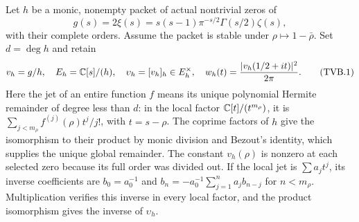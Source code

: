 Let $h$ be a monic, nonempty packet of actual nontrivial zeros of
\[
 g(s)=2\xi(s)=s(s-1)\pi^{-s/2}\Gamma(s/2)\zeta(s),
\]
with their complete orders. Assume the packet is stable under
$\rho\mapsto1-\bar\rho$. Set $d=\deg h$ and retain
\[
 v_h=g/h,\quad E_h=\mathbb C[s]/(h),\quad
 \upsilon_h=[v_h]_h\in E_h^\times,\quad
 w_h(t)=\frac{|v_h(1/2+it)|^2}{2\pi}.
 \tag{TVB.1}
\]
Here the jet of an entire function $f$ means its unique polynomial
Hermite remainder of degree less than $d$: in the local factor
$\mathbb C[t]/(t^{m_\rho})$, it is
$\sum_{j<m_\rho}f^{(j)}(\rho)t^j/j!$, with $t=s-\rho$.
The coprime factors of $h$ give the isomorphism to their product
by monic division and Bezout's identity, which supplies the
unique global remainder. The constant $v_h(\rho)$ is nonzero
at each selected zero because its full order was divided out.
If the local jet is $\sum a_jt^j$, its inverse coefficients are
$b_0=a_0^{-1}$ and
$b_n=-a_0^{-1}\sum_{j=1}^n a_jb_{n-j}$ for $n<m_\rho$.
Multiplication verifies this inverse in every local factor,
and the product isomorphism gives the inverse of $\upsilon_h$.

